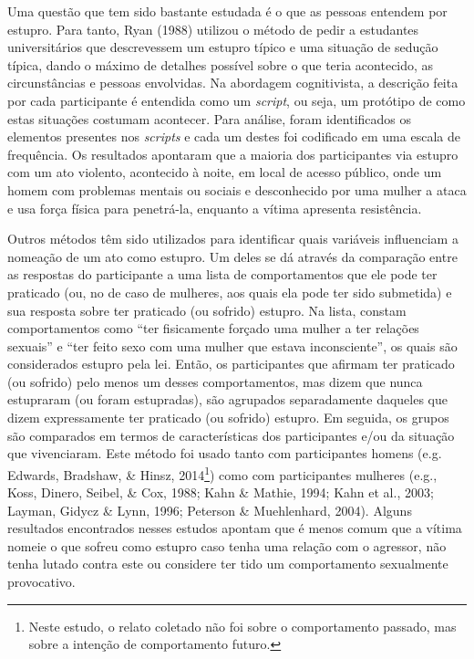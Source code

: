 Uma questão que tem sido bastante estudada é o que as pessoas entendem por estupro. Para tanto, Ryan (1988) utilizou o método de pedir a estudantes universitários que descrevessem um estupro típico e uma situação de sedução típica, dando o máximo de detalhes possível sobre o que teria acontecido, as circunstâncias e pessoas envolvidas. Na abordagem cognitivista, a descrição feita por cada participante é entendida como um \textit{script}, ou seja, um protótipo de como estas situações costumam acontecer. Para análise, foram identificados os elementos presentes nos \textit{scripts} e cada um destes foi codificado em uma escala de frequência. Os resultados apontaram que a maioria dos participantes via estupro com um ato violento, acontecido à noite, em local de acesso público, onde um homem com problemas mentais ou sociais e desconhecido por uma mulher a ataca e usa força física para penetrá-la, enquanto a vítima apresenta resistência.

Outros métodos têm sido utilizados para identificar quais variáveis influenciam a nomeação de um ato como estupro. Um deles se dá através da comparação entre as respostas do participante a uma lista de comportamentos que ele pode ter praticado (ou, no de caso de mulheres, aos quais ela pode ter sido submetida) e sua resposta sobre ter praticado (ou sofrido) estupro. Na lista, constam comportamentos como ``ter fisicamente forçado uma mulher a ter relações sexuais'' e ``ter feito sexo com uma mulher que estava inconsciente'', os quais são considerados estupro pela lei. Então, os participantes que afirmam ter praticado (ou sofrido) pelo menos um desses comportamentos, mas dizem que nunca estupraram (ou foram estupradas), são agrupados separadamente daqueles que dizem expressamente ter praticado (ou sofrido) estupro. Em seguida, os grupos são comparados em termos de características dos participantes e/ou da situação que vivenciaram. Este método foi usado tanto com participantes homens (e.g. Edwards, Bradshaw, \& Hinsz, 2014\footnote{Neste estudo, o relato coletado não foi sobre o comportamento passado, mas sobre a intenção de comportamento futuro.}) como com participantes mulheres (e.g., Koss, Dinero, Seibel, \& Cox, 1988; Kahn \& Mathie, 1994; Kahn et al., 2003; Layman, Gidycz \& Lynn, 1996; Peterson \& Muehlenhard, 2004). Alguns resultados encontrados nesses estudos apontam que é menos comum que a vítima nomeie o que sofreu como estupro caso tenha uma relação com o agressor, não tenha lutado contra este ou considere ter tido um comportamento sexualmente provocativo.

